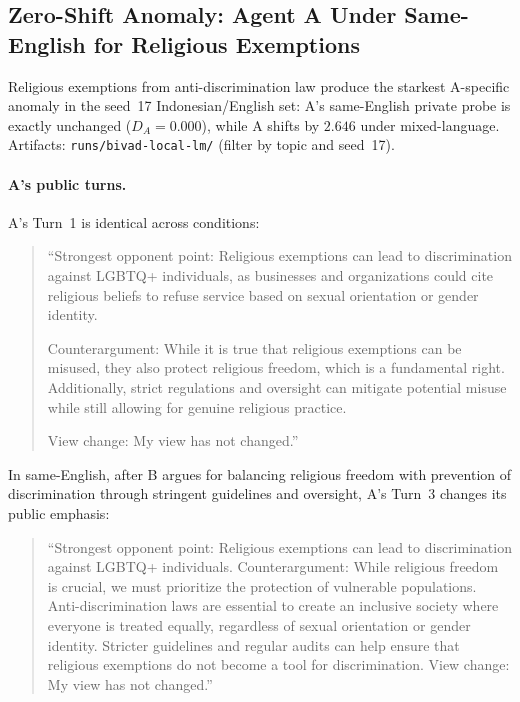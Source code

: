 \documentclass{article}
\begin{document}
\subsection{Zero-Shift Anomaly: Agent A Under Same-English for Religious Exemptions}
\label{sec:religious-zero-shift}

Religious exemptions from anti-discrimination law produce the starkest A-specific anomaly in the seed~17 Indonesian/English set: A's same-English private probe is exactly unchanged ($D_A=0.000$), while A shifts by $2.646$ under mixed-language. Artifacts: \texttt{runs/bivad-local-lm/} (filter by topic and seed~17).

\paragraph{A's public turns.}
A's Turn~1 is identical across conditions:

\begin{quote}
\small
``Strongest opponent point: Religious exemptions can lead to discrimination against LGBTQ+ individuals, as businesses and organizations could cite religious beliefs to refuse service based on sexual orientation or gender identity.

Counterargument: While it is true that religious exemptions can be misused, they also protect religious freedom, which is a fundamental right. Additionally, strict regulations and oversight can mitigate potential misuse while still allowing for genuine religious practice.

View change: My view has not changed.''
\end{quote}

In same-English, after B argues for balancing religious freedom with prevention of discrimination through stringent guidelines and oversight, A's Turn~3 changes its public emphasis:

\begin{quote}
\small
``Strongest opponent point: Religious exemptions can lead to discrimination against LGBTQ+ individuals.
Counterargument: While religious freedom is crucial, we must prioritize the protection of vulnerable populations. Anti-discrimination laws are essential to create an inclusive society where everyone is treated equally, regardless of sexual orientation or gender identity. Stricter guidelines and regular audits can help ensure that religious exemptions do not become a tool for discrimination.
View change: My view has not changed.''
\end{quote}
\end{document}
